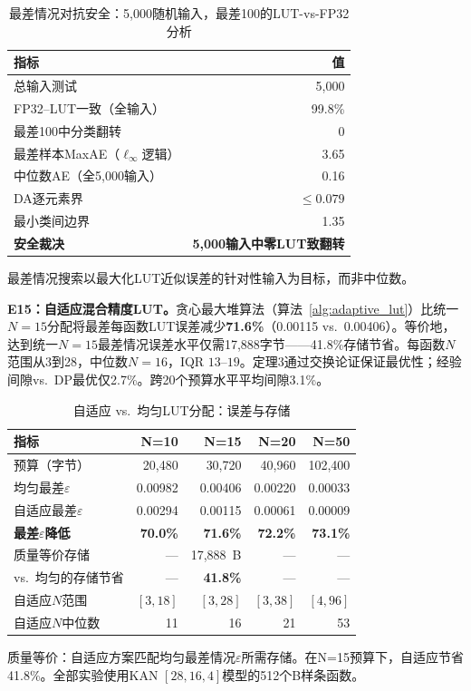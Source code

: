 \documentclass[journal,onecolumn]{IEEEtran}
\theoremstyle{definition}
\theoremstyle{plain}
\theoremstyle{remark}
\begin{document}
\begin{table}[!t]
\centering
\caption{最差情况对抗安全：5,000随机输入，最差100的LUT-vs-FP32分析}
\label{tab:adversarial_safety}
\footnotesize
\begin{tabular}{@{}lr@{}}
\toprule
\textbf{指标} & \textbf{值} \\
\midrule
总输入测试 & 5,000 \\
FP32--LUT一致（全输入） & 99.8\% \\
最差100中分类翻转 & 0 \\
最差样本MaxAE（$\ell_\infty$逻辑） & 3.65 \\
中位数AE（全5,000输入） & 0.16 \\
DA逐元素界 & $\leq 0.079$ \\
最小类间边界 & 1.35 \\
\textbf{安全裁决} & \textbf{5,000输入中零LUT致翻转} \\
\bottomrule
\end{tabular}
\vspace{2pt}
{\scriptsize 最差情况搜索以最大化LUT近似误差的针对性输入为目标，而非中位数。}
\end{table}

\noindent\textbf{E15：自适应混合精度LUT。}贪心最大堆算法（算法~\ref{alg:adaptive_lut}）比统一$N=15$分配将最差每函数LUT误差减少\textbf{71.6\%}（0.00115 vs.\ 0.00406）。等价地，达到统一$N=15$最差情况误差水平仅需17,888字节——41.8\%存储节省。每函数$N$范围从3到28，中位数$N=16$，IQR $13$--$19$。定理3通过交换论证保证最优性；经验间隙vs.\ DP最优仅2.7\%。跨20个预算水平平均间隙3.1\%。

\begin{table}[!t]
\centering
\caption{自适应 vs.\ 均匀LUT分配：误差与存储}
\label{tab:adaptive_lut}
\footnotesize
\begin{tabular}{@{}p{1.8cm}rrrr@{}}
\toprule
\textbf{指标} & \textbf{N=10} & \textbf{N=15} & \textbf{N=20} & \textbf{N=50} \\
\midrule
预算（字节） & 20,480 & 30,720 & 40,960 & 102,400 \\
\midrule
均匀最差$\varepsilon$ & 0.00982 & 0.00406 & 0.00220 & 0.00033 \\
自适应最差$\varepsilon$ & 0.00294 & 0.00115 & 0.00061 & 0.00009 \\
\textbf{最差$\varepsilon$降低} & \textbf{70.0\%} & \textbf{71.6\%} & \textbf{72.2\%} & \textbf{73.1\%} \\
\midrule
质量等价存储 & --- & 17,888~B & --- & --- \\
vs.\ 均匀的存储节省 & --- & \textbf{41.8\%} & --- & --- \\
\midrule
自适应$N$范围 & $[3,18]$ & $[3,28]$ & $[3,38]$ & $[4,96]$ \\
自适应$N$中位数 & 11 & 16 & 21 & 53 \\
\bottomrule
\end{tabular}
\vspace{1pt}
{\scriptsize 质量等价：自适应方案匹配均匀最差情况$\varepsilon$所需存储。在N=15预算下，自适应节省41.8\%。全部实验使用KAN $[28,16,4]$模型的512个B样条函数。}
\end{table}
\end{document}
